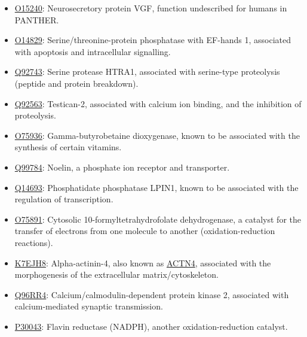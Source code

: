 \begin{itemize}
\item \href{http://www.pantherdb.org/genes/gene.do?acc=HUMAN\%7CHGNC\%3D12684\%7CUniProtKB\%3DO15240}{O15240}: Neurosecretory protein VGF, function undescribed for humans in PANTHER.
\item \href{http://www.pantherdb.org/genes/gene.do?acc=HUMAN\%7CHGNC\%3D9243\%7CUniProtKB\%3DO14829}{O14829}: Serine/threonine-protein phosphatase with EF-hands 1, associated with apoptosis and intracellular signalling.
\item \href{http://www.pantherdb.org/genes/gene.do?acc=HUMAN\%7CHGNC\%3D9476\%7CUniProtKB\%3DQ92743}{Q92743}: Serine protease HTRA1, associated with serine-type proteolysis (peptide and protein breakdown).
\item \href{http://www.pantherdb.org/genes/gene.do?acc=HUMAN\%7CHGNC\%3D13564\%7CUniProtKB\%3DQ92563}{Q92563}: Testican-2, associated with calcium ion binding, and the inhibition of proteolysis.
\item \href{http://www.pantherdb.org/genes/gene.do?acc=HUMAN\%7CHGNC\%3D964\%7CUniProtKB\%3DO75936}{O75936}: Gamma-butyrobetaine dioxygenase, known to be associated with the synthesis of certain vitamins.
\item \href{http://www.pantherdb.org/genes/gene.do?acc=HUMAN\%7CHGNC\%3D17187\%7CUniProtKB\%3DQ99784}{Q99784}: Noelin, a phosphate ion receptor and transporter.
\item \href{http://www.pantherdb.org/genes/gene.do?acc=HUMAN\%7CHGNC\%3D13345\%7CUniProtKB\%3DQ14693}{Q14693}: Phosphatidate phosphatase LPIN1, known to be associated with the regulation of transcription.
\item \href{http://www.pantherdb.org/genes/gene.do?acc=HUMAN\%7CHGNC\%3D3978\%7CUniProtKB\%3DO75891}{O75891}: Cytosolic 10-formyltetrahydrofolate dehydrogenase, a catalyst for the transfer of electrons from one molecule to another (oxidation-reduction reactions).
\item \href{http://www.pantherdb.org/genes/gene.do?acc=HUMAN\%7CHGNC\%3D166\%7CUniProtKB\%3DO43707}{K7EJH8}: Alpha-actinin-4, also known as \href{https://www.uniprot.org/uniprot/K7EJH8}{ACTN4}, associated with the morphogenesis of the extracellular matrix/cytoskeleton.
\item \href{http://www.pantherdb.org/genes/gene.do?acc=HUMAN\%7CHGNC\%3D1470\%7CUniProtKB\%3DQ96RR4}{Q96RR4}: Calcium/calmodulin-dependent protein kinase 2, associated with calcium-mediated synaptic transmission.
\item \href{http://www.pantherdb.org/genes/gene.do?acc=HUMAN\%7CHGNC\%3D1063\%7CUniProtKB\%3DP30043}{P30043}: Flavin reductase (NADPH), another oxidation-reduction catalyst.

\end{itemize}
